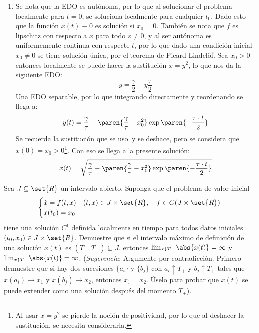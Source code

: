 \documentclass{homework}
\begin{document}
\begin{sol}
    \begin{enumerate}
        \item Se nota que la EDO es autónoma, por lo que al solucionar el problema localmente para \(t=0\), se soluciona localmente para cualquier \(t_0\). Dado esto que la función \(x(t)\equiv0\) es solución si \(x_0=0\). También se nota que \(f\) es lipschitz con respecto a \(x\) para todo \(x\neq0\), y al ser autónoma es uniformemente continua con respecto \(t\), por lo que dado una condición inicial \(x_0\neq0\) se tiene solución única, por el teorema de Picard-Lindelöf. Sea \(x_0>0\) entonces localmente se puede hacer la sustitución \(x=y^2\), lo que nos da la siguiente EDO:
        \begin{equation*}
            \dot{y}=\frac\gamma2-y\frac\tau2 
        \end{equation*}
        Una EDO separable, por lo que integrando directamente y reordenando se llega a:
        \begin{equation*}
            y(t)=\frac\gamma\tau-\paren{\frac\gamma\tau-x_0^2}\exp\paren{-\frac{\tau\cdot t}2}
        \end{equation*}
        Se recuerda la sustitución que se uso, y se deshace, pero se considera que \(x(0)=x_0>0\)\footnote{Al usar \(x=y^2\) se pierde la noción de positividad, por lo que al deshacer la sustitución, se necesita considerarla.}. Con eso se llega a la presente solución:
        \begin{equation*}
            x(t)=\sqrt{\frac\gamma\tau-\paren{\frac\gamma\tau-x_0^2}\exp\paren{-\frac{\tau\cdot t}2}}
        \end{equation*}
    \end{enumerate}
\end{sol}
\begin{prob}
    Sea \(J\subseteq\set{R}\) un intervalo abierto. Suponga que el problema de valor inicial
    \[\begin{cases}
            \dot{x}=f(t,x) & (t,x)\in J\times\set{R},\quad f\in C(J\times\set{R}) \\
            x(t_0)=x_0
        \end{cases}\]
    tiene una solución \(C^1\) definida localmente en tiempo para todos datos iniciales \((t_0,x_0)\in J\times\set{R}\). Demuestre que si el intervalo máximo de definición de una solución \(x(t)\) es \((T_-,T_+)\subseteq J\), entonces \(\lim_{x\downarrow T_-}\abs{x(t)}=\infty\) y \(\lim_{x\uparrow T_+}\abs{x(t)}=\infty\). (\textit{Sugerencia}: Argumente por contradicción. Primero demuestre que si hay dos sucesiones \(\{a_i\}\) y \(\{b_j\}\) con \(a_i\uparrow T_+\) y \(b_j\uparrow T_+\) tales que \(x(a_i)\rightarrow x_1\) y \(x(b_j)\rightarrow x_2\), entonces \(x_1=x_2\). Úselo para probar que \(x(t)\) se puede extender como una solución después del momento \(T_+\)).
\end{prob}
\end{document}
